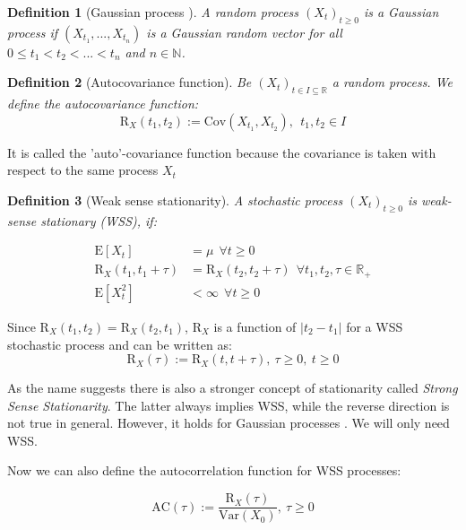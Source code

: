 \documentclass[%
thesis=student,%
coverpage=false,%
titlepage=false,%
headmarks=true, %
english,%
font=libertine, %
math=newpxtx, %
BCOR=5mm,%
coverBCOR=11mm%
]{tumbook}
\newtheorem{definition}{Definition}[section]
\begin{document}
\begin{definition}[Gaussian process \cite{gantert:2024}]
    A random process $(X_{t})_{t\geq 0}$ is a Gaussian process if $(X_{t_{1}},...,X_{t_{n}})$ is a Gaussian random vector for all $0 \leq t_{1} < t_{2} < ... < t_{n}$  and $n \in \mathbb{N}$.
\end{definition}


\begin{definition}[Autocovariance function]
Be $(X_{t})_{t \in I \subseteq \mathbb{R}}$ a random process. We define the autocovariance function: 
\[
\mathrm{R}_{X}(t_{1},t_{2}) := \mathrm{Cov}(X_{t_{1}},X_{t_{2}}), \ \ t_{1},t_{2} \in I
\]    
\end{definition}

It is called the 'auto'-covariance function because the covariance is taken with respect to the same process $X_{t}$


\begin{definition}[Weak sense stationarity]
A stochastic process $(X_{t})_{t\geq 0}$ is weak-sense stationary (WSS), if:

\begin{subequations}
    \begin{align}
        \mathrm{E}[X_{t}] &= \mu \ \ \forall t \geq 0 \\
        \mathrm{R}_{X}(t_{1},t_{1} + \tau) &= \mathrm{R}_{X}(t_{2},t_{2} + \tau) \ \ \forall t_{1},t_{2},\tau \in \mathbb{R}_{+} \\
        \mathrm{E}[X_{t}^2]&<\infty \ \ \forall t \geq 0
    \end{align}
\end{subequations}   
\end{definition}

Since $\mathrm{R}_{X}(t_{1},t_{2}) = \mathrm{R}_{X}(t_{2},t_{1})$, $\mathrm{R}_{X}$ is a function of $\lvert t_{2} - t_{1} \rvert$ for a WSS stochastic process and can be written as:
\[
\mathrm{R}_{X}(\tau) := \mathrm{R}_{X}(t,t + \tau), \ \tau \geq 0, \ t \geq 0
\]

As the name suggests there is also a stronger concept of stationarity called \textit{Strong Sense Stationarity}. The latter always implies WSS, while the reverse direction is not true in general. However, it holds for Gaussian processes \cite{Gallager:2014}. We will only need WSS.

Now we can also define the autocorrelation function for WSS processes:

\[
\text{AC}(\tau) := \frac{\mathrm{R}_{X}(\tau)}{\text{Var}(X_{0})}, \ \tau \geq 0
\]
\end{document}
